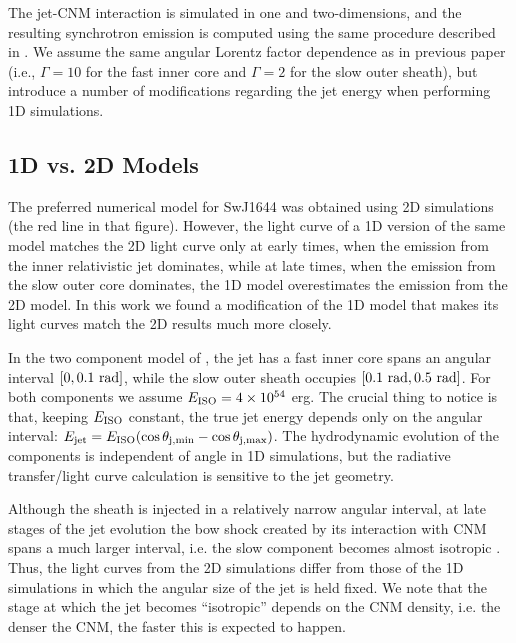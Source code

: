 \documentclass[usenatbib,fleqn]{mnras}
\begin{document}
The jet-CNM interaction is simulated in one and two-dimensions, and
the resulting synchrotron emission is computed using the same
procedure described in \citet{Mimica+2015}. We assume the same angular
Lorentz factor dependence as in previous paper (i.e., $\Gamma = 10$
for the fast inner core and $\Gamma = 2$ for the slow outer sheath),
but introduce a number of modifications regarding the jet energy
when performing 1D simulations.

\subsection{1D vs. 2D Models}
\label{sec:2D}

The preferred numerical model for SwJ1644 \citep[Fig.10
in][]{Mimica+2015} was obtained using 2D simulations (the red line in
that figure). However, the light curve of a 1D version of the same
model \citep[black line in Fig. 10 in][see also section 4.2 of that
paper]{Mimica+2015} matches the 2D light curve only at early times,
when the emission from the inner relativistic jet dominates, while at
late times, when the emission from the slow outer core dominates, the
1D model overestimates the emission from the 2D model. In this work we
found a modification of the 1D model that makes its light curves
match the 2D results much more closely.

In the two component model of \citet{Mimica+2015}, the jet has a fast
inner core spans an angular interval $[0, 0.1\ {\rm rad}]$, while the
slow outer sheath occupies $[0.1\ {\rm rad}, 0.5\ {\rm rad}]$. For
both components we assume $E_{\rm ISO} = 4\times 10^{54}$ erg. The
crucial thing to notice is that, keeping $E_{\rm ISO}$ constant, the
true jet energy depends only on the angular interval: $E_{\rm jet} =
E_{\rm ISO} (\cos\theta_{\rm j,min} - \cos\theta_{\rm j,max})$. The
hydrodynamic evolution of the components is independent of angle in 1D
simulations, but the radiative transfer/light curve calculation is
sensitive to the jet geometry.

Although the sheath is injected in a relatively
narrow angular interval, at late stages of the jet evolution the bow
shock created by its interaction with CNM spans a much larger interval,
i.e. the slow component becomes almost isotropic \citep[bottom two
panels in Fig. 8 in][]{Mimica+2015}. Thus, the light curves from the
2D simulations differ from those of the 1D simulations in which the
angular size of the jet is held fixed. We note that the stage at
which the jet becomes ``isotropic'' depends on the CNM density,
i.e. the denser the CNM, the faster this is expected to happen.
\end{document}

